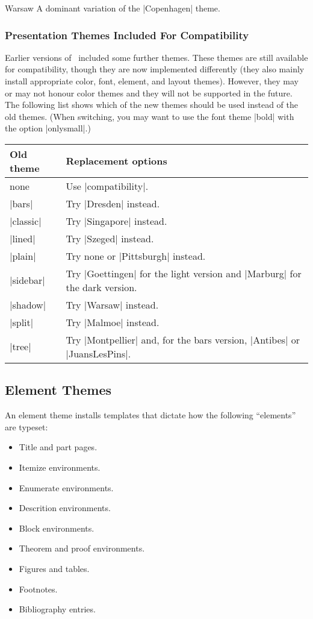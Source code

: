 \begin{themeexample}{Warsaw}
  A dominant variation of the |Copenhagen| theme.
\end{themeexample}


\subsubsection{Presentation Themes Included For Compatibility}

Earlier versions of \beamer\ included some further themes. These
themes are still available for compatibility, though they are now
implemented differently (they also mainly install appropriate color,
font, element, and layout themes). However, they may or may not honour
color themes and they will not be supported in the future. The
following list shows which of the new themes should be used instead of
the old themes. (When switching, you may want to use the font theme
|bold| with the option |onlysmall|.)

\medskip
\begin{tabular}{lp{13cm}}
  Old theme & Replacement options \\\hline
  none & Use |compatibility|. \\
  |bars| & Try |Dresden| instead. \\
  |classic| & Try |Singapore| instead. \\
  |lined| & Try |Szeged| instead. \\
  |plain| & Try none or |Pittsburgh| instead. \\
  |sidebar| & Try |Goettingen| for the light version and |Marburg| for
  the dark version. \\
  |shadow| & Try |Warsaw| instead. \\
  |split| & Try |Malmoe| instead. \\
  |tree| & Try |Montpellier| and, for the bars version, |Antibes| or
  |JuansLesPins|. 
\end{tabular}
\medskip






\subsection{Element Themes}

An element theme installs templates that dictate how the following
``elements'' are typeset:
\begin{itemize}
\item Title and part pages.
\item Itemize environments.
\item Enumerate environments.
\item Descrition environments.
\item Block environments.
\item Theorem and proof environments.
\item Figures and tables.
\item Footnotes.
\item Bibliography entries.
\end{itemize}


